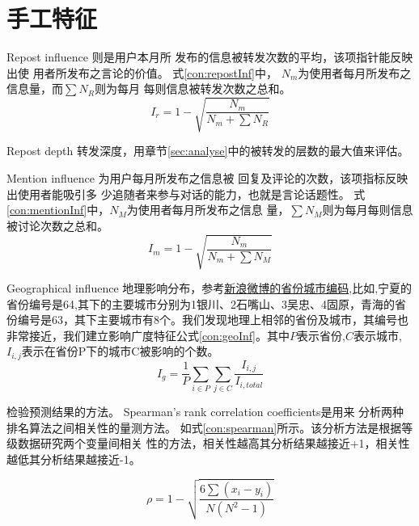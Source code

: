 \section{手工特征}
Repost influence 则是用户本月所 发布的信息被转发次数的平均，该项指针能反映出使 用者所发布之言论的价值。
式\ref{con:repostInf}中，
$N_m$为使用者每月所发布之信息量，而$\sum N_R$则为每月 每则信息被转发次数之总和。
\begin{equation}
I_r=1-\sqrt{\frac{N_m}{N_m+\sum N_R}}
\label{con:repostInf}
\end{equation}

Repost depth 转发深度，用章节\ref{sec:analyse}中的被转发的层数的最大值来评估。


Mention influence 为用户每月所发布之信息被 回复及评论的次数，该项指标反映出使用者能吸引多 少追随者来参与对话的能力，也就是言论话题性。
式\ref{con:mentionInf}中，$N_M$为使用者每月所发布之信息
量，$\sum N_M$则为每月每则信息被讨论次数之总和。
\begin{equation}
I_m=1-\sqrt{\frac{N_m}{N_m+\sum N_M}}
\label{con:mentionInf}
\end{equation}


Geographical influence 地理影响分布，参考\href{https://open.weibo.com/wiki/%E7%9C%81%E4%BB%BD%E5%9F%8E%E5%B8%82%E7%BC%96%E7%A0%81%E8%A1%A8}{新浪微博的省份城市编码},比如,宁夏的省份编号是64,其下的主要城市分别为1银川、2石嘴山、3吴忠、4固原，青海的省份编号是63，其下主要城市有8个。我们发现地理上相邻的省份及城市，其编号也非常接近，我们建立影响广度特征公式\ref{con:geoInf}。其中$P$表示省份,$C$表示城市,$I_{i,j}$表示在省份P下的城市C被影响的个数。
\begin{equation}
I_g=\frac{1}{P}\sum_{i\in P}\sum_{j\in C}\frac{I_{i,j}}{I_{i,total}}
\label{con:geoInf}
\end{equation}


检验预测结果的方法。
Spearman’s rank correlation coefficients是用来 分析两种排名算法之间相关性的量测方法。
如式\ref{con:spearman}所示。该分析方法是根据等级数据研究两个变量间相关 性的方法，相关性越高其分析结果越接近+1，相关性 越低其分析结果越接近-1。

\begin{equation}
\rho=1-\sqrt{\frac{6\sum (x_i-y_i)}{N(N^2-1)}}
\label{con:spearman}
\end{equation}
